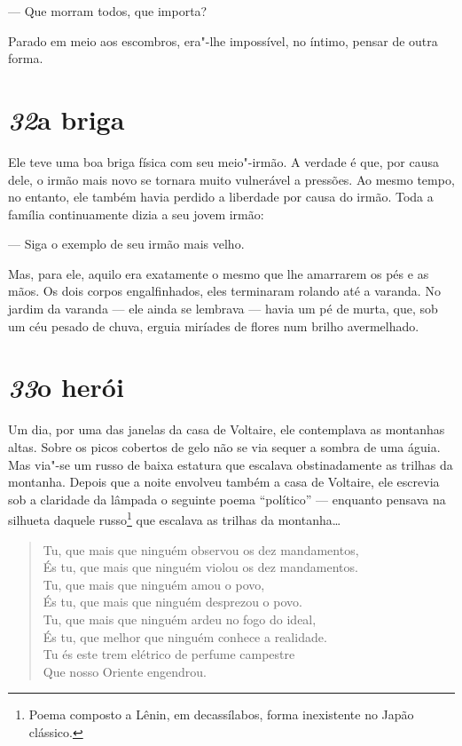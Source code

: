 --- Que morram todos, que importa?

Parado em meio aos escombros, era"-lhe impossível, no íntimo, pensar de
outra forma.

\section*{\textit{32}\es a briga}

Ele teve uma boa briga física com seu meio"-irmão. A verdade é que, por
causa dele, o irmão mais novo se tornara muito vulnerável a pressões.
Ao mesmo tempo, no entanto, ele também havia perdido a liberdade por
causa do irmão. Toda a família continuamente dizia a seu jovem irmão:

--- Siga o exemplo de seu irmão mais velho.

Mas, para ele, aquilo era exatamente o mesmo que lhe amarrarem os pés e
as mãos. Os dois corpos engalfinhados, eles terminaram rolando até a
varanda. No jardim da varanda --- ele ainda se lembrava --- havia um pé de
murta, que, sob um céu pesado de chuva, erguia miríades de flores num
brilho avermelhado.

\section*{\textit{33}\es o herói}

Um dia, por uma das janelas da casa de Voltaire, ele contemplava as
montanhas altas. Sobre os picos cobertos de gelo não se via sequer a
sombra de uma águia. Mas via"-se um russo de baixa estatura que escalava
obstinadamente as trilhas da montanha. Depois que a noite envolveu
também a casa de Voltaire, ele escrevia sob a claridade da lâmpada o
seguinte poema ``político'' --- enquanto pensava na silhueta daquele
russo\footnote{ Poema composto a Lênin, em decassílabos, forma 
inexistente no Japão clássico.} que escalava as trilhas da montanha\ldots{}

\begin{verse}
Tu, que mais que ninguém observou os dez mandamentos,\\
És tu, que mais que ninguém violou os dez mandamentos.\\
Tu, que mais que ninguém amou o povo,\\
És tu, que mais que ninguém desprezou o povo.\\
Tu, que mais que ninguém ardeu no fogo do ideal,\\
És tu, que melhor que ninguém conhece a realidade.\\
Tu és este trem elétrico de perfume campestre\\
Que nosso Oriente engendrou.
\end{verse}


